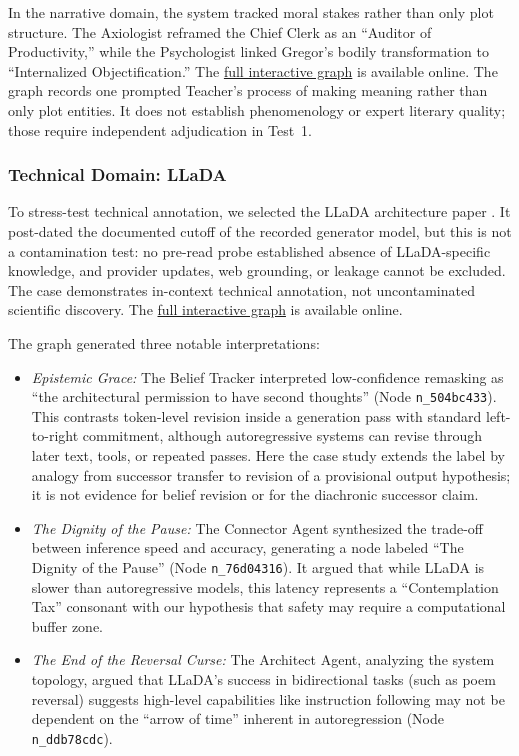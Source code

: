In the narrative domain, the system tracked moral stakes rather than only plot
structure. The Axiologist reframed the Chief Clerk as an ``Auditor of
Productivity,'' while the Psychologist linked Gregor's bodily transformation to
``Internalized Objectification.'' The
\href{https://emergentwisdom.org/entangled-alignment/?project=metamorphosis}{full interactive graph}
is available online.
The graph records one prompted Teacher's process of making meaning rather than
only plot entities. It does not establish phenomenology or expert literary
quality; those require independent adjudication in Test~1.


\subsubsection{Technical Domain: LLaDA}\label{sec:llada-case}

To stress-test technical annotation, we selected the LLaDA architecture paper
\cite{nie2025llada}. It post-dated the documented cutoff of the recorded
generator model, but this is not a contamination test: no pre-read probe
established absence of LLaDA-specific knowledge, and provider updates, web
grounding, or leakage cannot be excluded. The case demonstrates in-context
technical annotation, not uncontaminated scientific discovery. The
\href{https://emergentwisdom.org/entangled-alignment/?project=llada}{full interactive graph}
is available online.

The graph generated three notable interpretations:

\begin{itemize}
    \item \emph{Epistemic Grace:} The Belief Tracker interpreted low-confidence
    remasking as ``the architectural permission to have second thoughts'' (Node
    \texttt{n\_504bc433}). This contrasts token-level revision inside a
    generation pass with standard left-to-right commitment, although
    autoregressive systems can revise through later text, tools, or repeated
    passes. Here the case study extends the label by analogy from successor
    transfer to revision of a provisional output hypothesis; it is not evidence
    for belief revision or for the diachronic successor claim.

    \item \emph{The Dignity of the Pause:} The Connector Agent synthesized the trade-off between inference speed and accuracy, generating a node labeled ``The Dignity of the Pause'' (Node \texttt{n\_76d04316}). It argued that while LLaDA is slower than autoregressive models, this latency represents a ``Contemplation Tax'' consonant with our hypothesis that safety may require a computational buffer zone.

    \item \emph{The End of the Reversal Curse:} The Architect Agent, analyzing the system topology, argued that LLaDA's success in bidirectional tasks (such as poem reversal) suggests high-level capabilities like instruction following may not be dependent on the ``arrow of time'' inherent in autoregression (Node \texttt{n\_ddb78cdc}).
\end{itemize}

